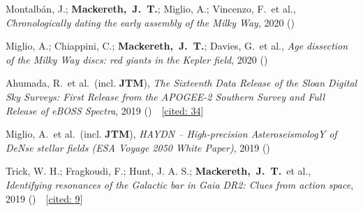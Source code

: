 \item[{\scriptsize5}]Montalb{\'a}n, J.; \textbf{Mackereth,~J.~T.}; Miglio, A.; Vincenzo, F.~et al., \textit{Chronologically dating the early assembly of the Milky Way}, 2020 ()

\item[{\scriptsize4}]Miglio, A.; Chiappini, C.; \textbf{Mackereth,~J.~T.}; Davies, G.~et al., \textit{Age dissection of the Milky Way discs: red giants in the Kepler field}, 2020 ()

\item[{\scriptsize3}]Ahumada, R.~et al.~(incl. \textbf{JTM}), \textit{The Sixteenth Data Release of the Sloan Digital Sky Surveys: First Release from the APOGEE-2 Southern Survey and Full Release of eBOSS Spectra}, 2019 ()~~{\footnotesize[\href{http://adsabs.harvard.edu/abs/2019arXiv191202905A}{cited: 34}]}

\item[{\scriptsize2}]Miglio, A.~et al.~(incl. \textbf{JTM}), \textit{HAYDN -- High-precision AsteroseismologY of DeNse stellar fields (ESA Voyage 2050 White Paper)}, 2019 ()

\item[{\scriptsize1}]Trick, W. H.; Fragkoudi, F.; Hunt, J. A. S.; \textbf{Mackereth,~J.~T.}~et al., \textit{Identifying resonances of the Galactic bar in Gaia DR2: Clues from action space}, 2019 ()~~{\footnotesize[\href{http://adsabs.harvard.edu/abs/2019arXiv190604786T}{cited: 9}]}